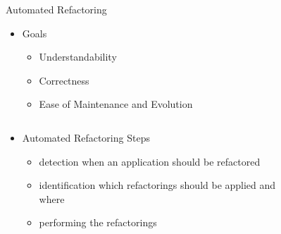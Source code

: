 \documentclass{beamer}
\begin{document}
\begin{frame}{Automated Refactoring}
  \begin{itemize}
    \item Goals
    \begin{itemize}
      \item Understandability
      \item Correctness
      \item Ease of Maintenance and Evolution
    \end{itemize}
  \end{itemize}
  \pause
  \begin{columns}[T]
    \begin{column}{.5\textwidth}
      \begin{itemize}
        \item Automated Refactoring Steps
        \begin{itemize}
          \item detection when an application should be refactored
          \item identification which refactorings should be applied and where
          \item performing the refactorings
        \end{itemize}
      \end{itemize}
    \end{column}
    \begin{column}{.5\textwidth}
      \begin{figure}[t]
        \centering
      \end{figure}
    \end{column}
  \end{columns} 
\end{frame}
\end{document}

